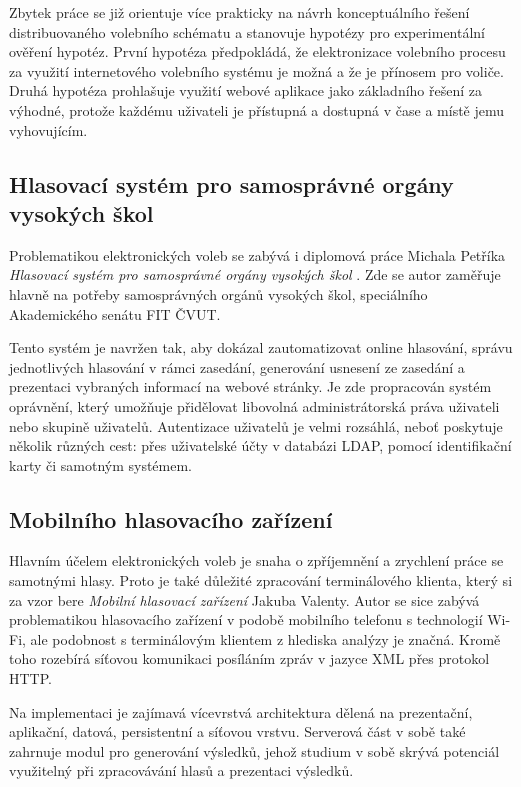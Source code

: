 \documentclass[11pt,twoside,a4paper]{book}
\begin{document}
Zbytek práce se již orientuje více prakticky na návrh konceptuálního řešení distribuovaného volebního schématu a stanovuje hypotézy pro experimentální ověření hypotéz. První hypotéza předpokládá, že elektronizace volebního procesu za využití internetového volebního systému je možná a že je přínosem pro voliče. Druhá hypotéza prohlašuje využití webové aplikace jako základního řešení za výhodné, protože každému uživateli je přístupná a dostupná v čase a místě jemu vyhovujícím.

\subsection{Hlasovací systém pro samosprávné orgány vysokých škol}
Problematikou elektronických voleb se zabývá i diplomová práce Michala Petříka \textit{Hlasovací systém pro samosprávné orgány vysokých škol} \cite{art:petrik}. Zde se autor zaměřuje hlavně na potřeby samosprávných orgánů vysokých škol, speciálního Akademického senátu FIT ČVUT. 

Tento systém je navržen tak, aby dokázal zautomatizovat online hlasování, správu jednotlivých hlasování v rámci zasedání, generování usnesení ze zasedání a prezentaci vybraných informací na webové stránky. Je zde propracován systém oprávnění, který umožňuje přidělovat libovolná administrátorská práva uživateli nebo skupině uživatelů. Autentizace uživatelů je velmi rozsáhlá, neboť poskytuje několik různých cest: přes uživatelské účty v databázi LDAP, pomocí identifikační karty či samotným systémem. 

\subsection{Mobilního hlasovacího zařízení}

Hlavním účelem elektronických voleb je snaha o zpříjemnění a zrychlení práce se samotnými hlasy. Proto je také důležité zpracování terminálového klienta, který si za vzor bere \textit{Mobilní hlasovací zařízení} \cite{art:valenta} Jakuba Valenty. Autor se sice zabývá problematikou hlasovacího zařízení v podobě mobilního telefonu s technologií Wi-Fi, ale podobnost s terminálovým klientem z hlediska analýzy je značná. Kromě toho rozebírá síťovou komunikaci posíláním zpráv v jazyce XML přes protokol HTTP.

Na implementaci je zajímavá vícevrstvá architektura dělená na prezentační, aplikační, datová, persistentní a síťovou vrstvu. Serverová část v sobě také zahrnuje modul pro generování výsledků, jehož studium v sobě skrývá potenciál využitelný při zpracovávání hlasů a prezentaci výsledků.
\end{document}

